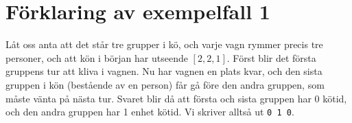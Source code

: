 \section*{Förklaring av exempelfall 1}
Låt oss anta att det står tre grupper i kö, och varje vagn rymmer precis tre personer, och att kön
i början har utseende $[2,2,1]$. Först blir det första gruppens tur att kliva
i vagnen. Nu har vagnen en plats kvar, och den sista gruppen i kön (bestående av en person) får gå
före den andra gruppen, som måste vänta på nästa tur. Svaret blir då att första och sista gruppen har 0 kötid, och den andra gruppen har 1 enhet kötid. Vi skriver alltså ut \texttt{0 1 0}.


